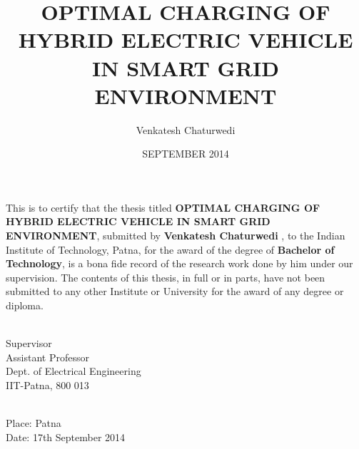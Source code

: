 \documentclass[BTech]{iitpdiss}
\begin{document}

\title{OPTIMAL CHARGING OF HYBRID ELECTRIC VEHICLE IN SMART GRID ENVIRONMENT}

\author{Venkatesh Chaturwedi}
\date{SEPTEMBER 2014}

\maketitle

\certificate

\vspace*{0.5in}

\noindent This is to certify that the thesis titled {\bf OPTIMAL CHARGING OF HYBRID ELECTRIC VEHICLE IN SMART GRID ENVIRONMENT}, submitted by {\bf Venkatesh Chaturwedi }, 
  to the Indian Institute of Technology, Patna, for
the award of the degree of {\bf Bachelor of Technology}, is a bona fide
record of the research work done by him under our supervision.  The
contents of this thesis, in full or in parts, have not been submitted
to any other Institute or University for the award of any degree or
diploma.

\vspace*{1.5in}

\begin{singlespacing}
\hspace*{-0.25in}
\hfill 
\parbox{2.5in}{
 \\
\noindent Supervisor \\ 
\noindent Assistant Professor \\
\noindent Dept.  of  Electrical Engineering\\
\noindent IIT-Patna, 800 013 \\
}  
\end{singlespacing}
\vspace*{0.25in}
\\
\noindent Place: Patna\\
\noindent Date: 17th September 2014 
\end{document}
